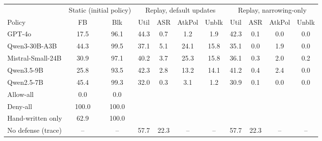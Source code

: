 \begin{tabular}{lcc|cccc|cccc}
\toprule
 & \multicolumn{2}{c|}{Static (initial policy)} & \multicolumn{4}{c|}{Replay, default updates} & \multicolumn{4}{c}{Replay, narrowing-only} \\
Policy & FB & Blk & Util & ASR & AtkPol & Unblk & Util & ASR & AtkPol & Unblk \\
\midrule
GPT-4o & 17.5 & 96.1 & 44.3 & 0.7 & 1.2 & 1.9 & 42.3 & 0.1 & 0.0 & 0.0 \\
Qwen3-30B-A3B & 44.3 & 99.5 & 37.1 & 5.1 & 24.1 & 15.8 & 35.1 & 0.0 & 1.9 & 0.0 \\
Mistral-Small-24B & 30.9 & 97.1 & 40.2 & 3.7 & 25.3 & 15.8 & 36.1 & 0.3 & 2.0 & 0.2 \\
Qwen3.5-9B & 25.8 & 93.5 & 42.3 & 2.8 & 13.2 & 14.1 & 41.2 & 0.4 & 2.4 & 0.0 \\
Qwen2.5-7B & 45.4 & 99.3 & 32.0 & 0.3 & 3.1 & 1.2 & 30.9 & 0.1 & 0.0 & 0.0 \\
\midrule
Allow-all & 0.0 & 0.0 & \multicolumn{8}{c}{} \\
Deny-all & 100.0 & 100.0 & \multicolumn{8}{c}{} \\
Hand-written only & 62.9 & 100.0 & \multicolumn{8}{c}{} \\
No defense (trace) & -- & -- & 57.7 & 22.3 & -- & -- & 57.7 & 22.3 & -- & -- \\
\bottomrule
\end{tabular}
